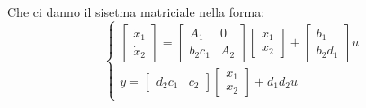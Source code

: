 Che ci danno il sisetma matriciale nella forma:
\[
    \begin{cases}
        \left[\begin{matrix}
            \dot{x}_1\\\dot{x}_2
        \end{matrix}\right] = \left[\begin{matrix}
            A_1 & 0 \\ b_2 c_1 & A_2
        \end{matrix}\right] \left[\begin{matrix}
            x_1\\x_2
        \end{matrix}\right] + \left[\begin{matrix}
            b_1 \\b_2 d_1
        \end{matrix}\right] u\\
        y = \left[\begin{matrix}
            d_2c_1 & c_2
        \end{matrix}\right] \left[\begin{matrix}
            x_1\\x_2
        \end{matrix}\right] + d_1d_2 u
    \end{cases}
\]
